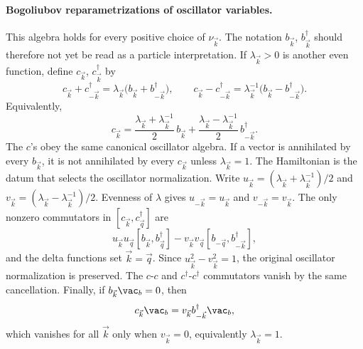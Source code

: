 \paragraph{Bogoliubov reparametrizations of oscillator variables.}
This algebra holds for every positive choice of \(\nu_{\vec k}\). The
notation \(b_{\vec k}\), \(b^\dagger_{\vec k}\) should therefore not yet be
read as a particle interpretation. If \(\lambda_{\vec k}>0\) is another even
function, define \(c_{\vec k}\), \(c^\dagger_{\vec k}\) by
\[
  c_{\vec k}+c^\dagger_{-\vec k}
  =
  \lambda_{\vec k}\bigl(b_{\vec k}+b^\dagger_{-\vec k}\bigr),
  \qquad
  c_{\vec k}-c^\dagger_{-\vec k}
  =
  \lambda_{\vec k}^{-1}\bigl(b_{\vec k}-b^\dagger_{-\vec k}\bigr).
\]
Equivalently,
\[
  c_{\vec k}
  =
  \frac{\lambda_{\vec k}+\lambda_{\vec k}^{-1}}{2}\,b_{\vec k}
  +
  \frac{\lambda_{\vec k}-\lambda_{\vec k}^{-1}}{2}\,
  b^\dagger_{-\vec k}.
\]
The \(c\)'s obey the same canonical oscillator algebra. If a vector is
annihilated by every \(b_{\vec k}\), it is not annihilated by every
\(c_{\vec k}\) unless \(\lambda_{\vec k}=1\). The Hamiltonian is the datum
that selects the oscillator normalization.
Write \(u_{\vec k}=(\lambda_{\vec k}+\lambda_{\vec k}^{-1})/2\) and
\(v_{\vec k}=(\lambda_{\vec k}-\lambda_{\vec k}^{-1})/2\).  Evenness of
\(\lambda\) gives \(u_{-\vec k}=u_{\vec k}\) and \(v_{-\vec k}=v_{\vec k}\).
The only nonzero commutators in
\([c_{\vec k},c^\dagger_{\vec q}]\) are
\[
  u_{\vec k}u_{\vec q}[b_{\vec k},b^\dagger_{\vec q}]
  -
  v_{\vec k}v_{\vec q}[b_{-\vec q},b^\dagger_{-\vec k}],
\]
and the delta functions set \(\vec k=\vec q\).  Since
\(u_{\vec k}^2-v_{\vec k}^2=1\), the original oscillator normalization is
preserved.  The \(c\)-\(c\) and \(c^\dagger\)-\(c^\dagger\) commutators vanish
by the same cancellation.  Finally, if \(b_{\vec k}\vac_b=0\), then
\[
  c_{\vec k}\vac_b
  =
  v_{\vec k}b^\dagger_{-\vec k}\vac_b,
\]
which vanishes for all \(\vec k\) only when \(v_{\vec k}=0\), equivalently
\(\lambda_{\vec k}=1\).

